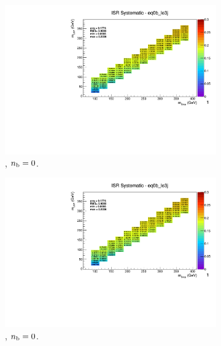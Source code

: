 \begin{figure}[ht!]
  \centering
  \begin{subfigure}[b]{0.32\textwidth}
    \includegraphics[width=\textwidth, page=12]{Figs/sms/t2degen/v19/systs_v2/T2_4body_ISR_eq0b_le3j.pdf}
    \caption{\njlow, $n_{\text{b}} = 0$.}
  \end{subfigure}
  \begin{subfigure}[b]{0.32\textwidth}
    \includegraphics[width=\textwidth, page=8]{Figs/sms/t2degen/v19/systs_v2/T2_4body_ISR_eq0b_le3j.pdf}
    \caption{\njlow, $n_{\text{b}} = 0$.}
  \end{subfigure}
  \begin{subfigure}[b]{0.32\textwidth}

\end{subfigure}
\end{figure}
